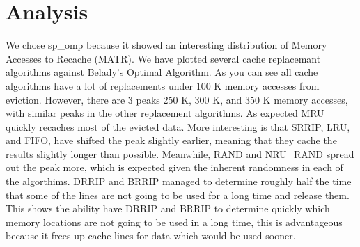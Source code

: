 \section{Analysis}

We chose sp_omp because it showed an interesting distribution of Memory Accesses to Recache (MATR).
	We have plotted several cache replacemant algorithms against Belady's Optimal Algorithm.
	As you can see all cache algorithms have a lot of replacements under 100 K memory accesses from eviction.
	However, there are 3 peaks 250 K, 300 K, and 350 K memory accesses, with similar peaks in the other replacement algorithms.
	As expected MRU quickly recaches most of the evicted data.
	More interesting is that SRRIP, LRU, and FIFO, have shifted the peak slightly earlier, meaning that they cache the results slightly longer than possible.
	Meanwhile, RAND and NRU_RAND spread out the peak more, which is expected given the inherent randomness in each of the algorthims.
	DRRIP and BRRIP managed to determine roughly half the time that some of the lines are not going to be used for a long time and release them.
	This shows the ability have DRRIP and BRRIP to determine quickly which memory locations are not going to be used in a long time,
		this is advantageous because it frees up cache lines for data which would be used sooner.

